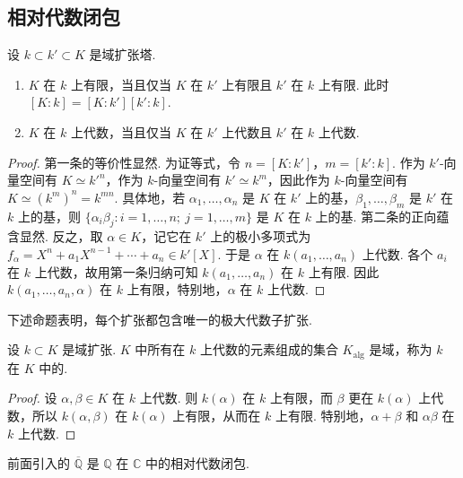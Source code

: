 \subsection{相对代数闭包}\label{sec:galois-2-1-5}
\begin{lemma*}
设 $k\subset k'\subset K$ 是域扩张塔.
\begin{enumerate}[label=\roman*)]
\item $K$ 在 $k$ 上有限，当且仅当 $K$ 在 $k'$ 上有限且 $k'$ 在 $k$ 上有限. 此时 $[K:k]=[K:k'][k':k]$.
\item $K$ 在 $k$ 上代数，当且仅当 $K$ 在 $k'$ 上代数且 $k'$ 在 $k$ 上代数.
\end{enumerate}
\end{lemma*}
\begin{proof}
第一条的等价性显然. 为证等式，令 $n=[K:k']$，$m=[k':k]$. 作为 $k'$-向量空间有 $K\simeq k'^n$，作为 $k$-向量空间有 $k'\simeq k^m$，因此作为 $k$-向量空间有 $K\simeq(k^m)^n=k^{mn}$. 具体地，若 $\alpha_1,\ldots,\alpha_n$ 是 $K$ 在 $k'$ 上的基，$\beta_1,\ldots,\beta_m$ 是 $k'$ 在 $k$ 上的基，则 $\{\alpha_i\beta_j:i=1,\ldots,n;\ j=1,\ldots,m\}$ 是 $K$ 在 $k$ 上的基.
第二条的正向蕴含显然. 反之，取 $\alpha\in K$，记它在 $k'$ 上的极小多项式为 $f_\alpha=X^n+a_1X^{n-1}+\cdots+a_n\in k'[X]$. 于是 $\alpha$ 在 $k(a_1,\ldots,a_n)$ 上代数. 各个 $a_i$ 在 $k$ 上代数，故用第一条归纳可知 $k(a_1,\ldots,a_n)$ 在 $k$ 上有限. 因此 $k(a_1,\ldots,a_n,\alpha)$ 在 $k$ 上有限，特别地，$\alpha$ 在 $k$ 上代数.
\end{proof}
下述命题表明，每个扩张都包含唯一的极大代数子扩张.
\begin{proposition*}
设 $k\subset K$ 是域扩张. $K$ 中所有在 $k$ 上代数的元素组成的集合 $K_{\mathrm{alg}}$ 是域，称为 $k$ 在 $K$ 中的.
\end{proposition*}
\begin{proof}
设 $\alpha,\beta\in K$ 在 $k$ 上代数. 则 $k(\alpha)$ 在 $k$ 上有限，而 $\beta$ 更在 $k(\alpha)$ 上代数，所以 $k(\alpha,\beta)$ 在 $k(\alpha)$ 上有限，从而在 $k$ 上有限. 特别地，$\alpha+\beta$ 和 $\alpha\beta$ 在 $k$ 上代数.
\end{proof}
\begin{example*}
前面引入的 $\overline{\mathbb Q}$ 是 $\mathbb Q$ 在 $\mathbb C$ 中的相对代数闭包.
\end{example*}
